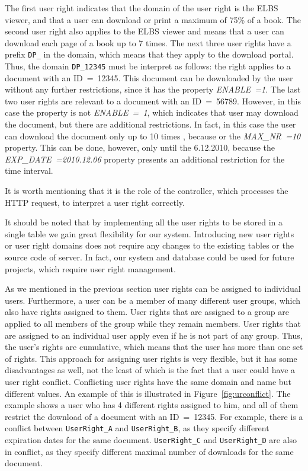 The first user right indicates that the domain of the user right is the ELBS viewer, and that a user can download or print a maximum of 75\% of a book.  The second user right also applies to the ELBS viewer and means that a user can download each page of a book up to 7 times.  The next three user rights have a prefix \verb=DP_= in the domain, which means that they apply to the download portal. Thus, the domain  \verb=DP_12345= must be interpret as follows: the right applies to a document with an ID~=~12345.
This document can be downloaded by the user without any 
further restrictions, since it has the property \emph{ENABLE~=1}. 
The last two user rights are relevant to a document with an ID~=~56789. However, in this case the property is not 
 \emph{ENABLE~=~1}, which indicates that user may download the document, but there are additional restrictions. In fact, in this case the user can download the document only up to 10 times , because or the \emph{MAX\_NR~=10} property. This can be done, however, only until
the 6.12.2010, because the \emph{EXP\_DATE~=2010.12.06} property presents an additional restriction for the time interval.

It is worth mentioning that it is the role of the controller, which processes the HTTP request, to interpret a user right correctly. 

It should be noted that by implementing all the user rights to be stored in a single table we gain great flexibility for our system. Introducing new user rights or user right domains does not require any changes to the existing tables or the source code of server. In fact, our system and database could be used for future projects, 
which require user right management.

 
As we mentioned in the previous section user rights can be assigned to individual users. Furthermore, a user 
can be a member of many different user groups, which also have rights assigned to them. 
User rights that are assigned to a group are applied to all members of the group while they remain members. 
User rights that are assigned to an individual user apply even if he is not part of any group.
Thus, the user's rights are cumulative, which means that the user has more than one set of rights.
This approach 
for assigning user rights is very flexible, but it has some disadvantages
as well, not the least of which is the fact that a user could have a user right conflict.
Conflicting user rights have
the same domain and name but different values. An example of this is illustrated in Figure~\ref{fig:urconflict}. The 
example shows a user who has 4 different rights assigned to him, and all of them restrict the 
download of a document with an ID~=~12345. For example, there is a conflict between \verb=UserRight_A=
and \verb=UserRight_B=, as they specify different expiration dates for the same document. 
\verb=UserRight_C= and \verb=UserRight_D= are also in conflict, as they specify different maximal number
of downloads for the same document.

